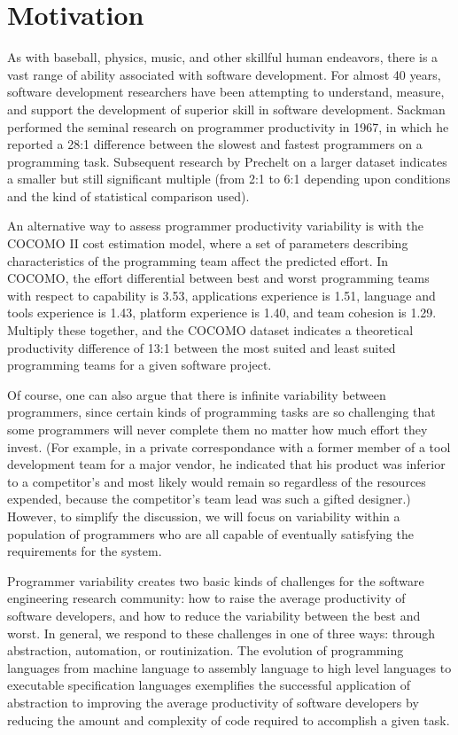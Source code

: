 \section{Motivation}

As with baseball, physics, music, and other skillful human endeavors, there
is a vast range of ability associated with software development.  For
almost 40 years, software development researchers have been attempting to
understand, measure, and support the development of superior skill in
software development.  Sackman performed the seminal research on programmer
productivity in 1967, in which he reported a 28:1 difference between the
slowest and fastest programmers on a programming task.  Subsequent research
by Prechelt on a larger dataset indicates a smaller but still significant
multiple (from 2:1 to 6:1 depending upon conditions and the kind of
statistical comparison used).  

An alternative way to assess programmer productivity variability is with
the COCOMO II cost estimation model, where a set of parameters describing
characteristics of the programming team affect the predicted effort.  In
COCOMO, the effort differential between best and worst programming teams with
respect to capability is 3.53, applications experience is 1.51, language
and tools experience is 1.43, platform experience is 1.40, and team
cohesion is 1.29.  Multiply these together, and the COCOMO dataset
indicates a theoretical productivity difference of 13:1 between the most
suited and least suited programming teams for a given software project.

Of course, one can also argue that there is infinite variability between
programmers, since certain kinds of programming tasks are so challenging
that some programmers will never complete them no matter how much effort
they invest. (For example, in a private correspondance with a former member
of a tool development team for a major vendor, he indicated that his
product was inferior to a competitor's and most likely would remain so
regardless of the resources expended, because the competitor's team lead
was such a gifted designer.) However, to simplify the discussion, we will
focus on variability within a population of programmers who are all capable
of eventually satisfying the requirements for the system.

Programmer variability creates two basic kinds of challenges for the
software engineering research community: how to raise the average
productivity of software developers, and how to reduce the variability
between the best and worst.  In general, we respond to these challenges in
one of three ways: through abstraction, automation, or routinization.  The
evolution of programming languages from machine language to assembly
language to high level languages to executable specification languages
exemplifies the successful application of abstraction to improving the
average productivity of software developers by reducing the amount and
complexity of code required to accomplish a given task.  




